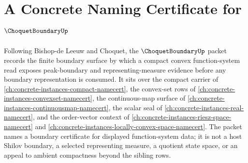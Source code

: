 \chapter{A Concrete Naming Certificate for $\ChoquetBoundaryUp$}
\label{ch:concrete-instances-choquet-boundary-namecert}

Following Bishop-de Leeuw and Choquet, the $\ChoquetBoundaryUp$ packet records the finite boundary surface by which a compact convex function-system read exposes peak-boundary and representing-measure evidence before any boundary representation is consumed. It sits over the compact carrier of \autoref{ch:concrete-instances-compact-namecert}, the convex-set rows of \autoref{ch:concrete-instances-convexset-namecert}, the continuous-map surface of \autoref{ch:concrete-instances-continuousmap-namecert}, the scalar seal of \autoref{ch:concrete-instances-real-namecert}, and the order-vector context of \autoref{ch:concrete-instances-riesz-space-namecert} and \autoref{ch:concrete-instances-locally-convex-space-namecert}. The packet names a boundary certificate for displayed function-system data; it is not a host Shilov boundary, a selected representing measure, a quotient state space, or an appeal to ambient compactness beyond the sibling rows.

